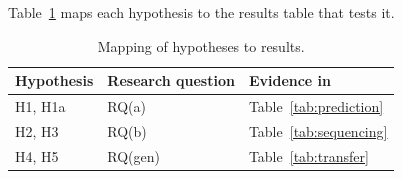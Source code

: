 Table~\ref{tab:hyp-map} maps each hypothesis to the results table that
tests it.

\begin{table}[t]
\caption{Mapping of hypotheses to results.}
\label{tab:hyp-map}
\centering
\small
\begin{tabular}{@{}lll@{}}
\toprule
\textbf{Hypothesis} & \textbf{Research question} & \textbf{Evidence in} \\
\midrule
H1, H1a & RQ(a)   & Table~\ref{tab:prediction} \\
H2, H3  & RQ(b)   & Table~\ref{tab:sequencing} \\
H4, H5  & RQ(gen) & Table~\ref{tab:transfer} \\
\bottomrule
\end{tabular}
\end{table}
